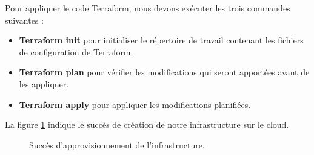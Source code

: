 Pour appliquer le code Terraform, nous devons exécuter les trois commandes suivantes :
\begin{itemize}
\item \textbf{Terraform init} pour initialiser le répertoire de travail contenant les fichiers de configuration de Terraform.

\item \textbf{Terraform plan} pour vérifier les modifications qui seront apportées avant de les appliquer.

\item \textbf{Terraform apply} pour appliquer les modifications planifiées.

\end{itemize}

La figure \ref{fig:succes} indique le succès de création de notre infrastructure sur le cloud.
   \begin{figure}[H]
        \centering
        \caption{Succès d'approvisionnement de l'infrastructure.}
        \label{fig:succes}
    \end{figure}

